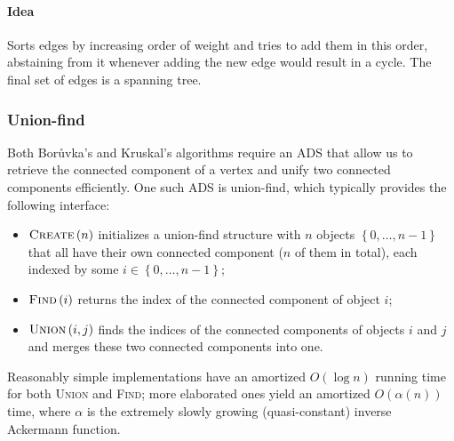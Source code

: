 \documentclass[a4paper]{article}
\begin{document}
\paragraph{Idea} Sorts edges by increasing order of weight and tries to add them in this order, abstaining from it whenever adding the new edge would result in a cycle. The final set of edges is a spanning tree.

\subsubsection{Union-find}

Both Bor\r{u}vka's and Kruskal's algorithms require an ADS that allow us to retrieve the connected component of a vertex and unify two connected components efficiently. One such ADS is union-find, which typically provides the following interface:
\begin{itemize}
\item $\textsc{Create}\left(n\right)$ initializes a union-find structure with $n$ objects $\left\lbrace 0, \dots, n-1\right\rbrace$ that all have their own connected component ($n$ of them in total), each indexed by some $i \in \left\lbrace 0, \dots, n-1\right\rbrace$;
\item $\textsc{Find}\left(i\right)$ returns the index of the connected component of object $i$;
\item $\textsc{Union}\left(i,j\right)$ finds the indices of the connected components of objects $i$ and $j$ and merges these two connected components into one.
\end{itemize}
Reasonably simple implementations have an amortized $O\left(\log n\right)$ running time for both \textsc{Union} and \textsc{Find}; more elaborated ones yield an amortized $O\left(\alpha\left(n\right)\right)$ time, where $\alpha$ is the extremely slowly growing (quasi-constant) inverse Ackermann function.





\newpage
\end{document}
